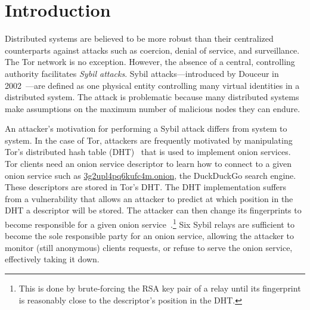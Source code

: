 \section{Introduction}
\label{sec:introduction}

Distributed systems are believed to be more robust than their centralized
counterparts against attacks such as coercion, denial of service, and
surveillance.  The Tor network is no exception. 
However, the absence of a central, controlling authority facilitates
\emph{Sybil attacks}.  Sybil attacks---introduced by Douceur in
2002~\cite{Douceur2002a}---are defined as one physical entity controlling many
virtual identities in a distributed system.  The attack is problematic because
many distributed systems make assumptions on the maximum number of malicious
nodes they can endure.

An attacker's motivation for performing a Sybil attack differs from system to
system.  In the case of Tor, attackers are frequently motivated by manipulating
Tor's distributed hash table (DHT)~\cite{rendspec} that is used to implement
onion services.  Tor clients need an onion service descriptor to learn how to
connect to a given onion service such as \url{3g2upl4pq6kufc4m.onion}, the
DuckDuckGo search engine.  These descriptors are stored in Tor's DHT.  The DHT
implementation suffers from a vulnerability that allows an attacker to predict
at which position in the DHT a descriptor will be stored.  The attacker can then
change its fingerprints to become responsible for a given onion
service~\cite{Biryukov2013a}.\footnote{This is done by brute-forcing the RSA key
pair of a relay until its fingerprint is reasonably close to the descriptor's
position in the DHT.}  Six Sybil relays are sufficient to become the sole
responsible party for an onion service, allowing the attacker to monitor (still
anonymous) clients requests, or refuse to serve the onion service, effectively
taking it down.

